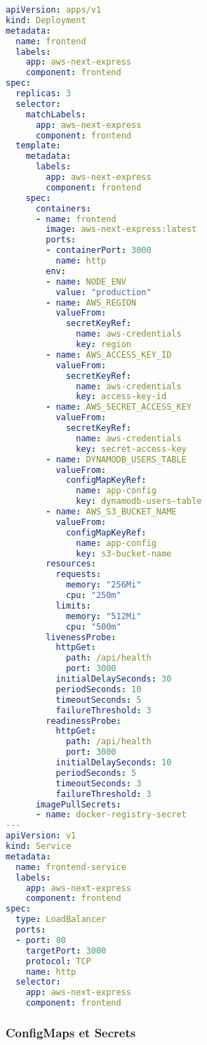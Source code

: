 \begin{lstlisting}[language=YAML, caption=k8s/frontend-deployment.yaml]
apiVersion: apps/v1
kind: Deployment
metadata:
  name: frontend
  labels:
    app: aws-next-express
    component: frontend
spec:
  replicas: 3
  selector:
    matchLabels:
      app: aws-next-express
      component: frontend
  template:
    metadata:
      labels:
        app: aws-next-express
        component: frontend
    spec:
      containers:
      - name: frontend
        image: aws-next-express:latest
        ports:
        - containerPort: 3000
          name: http
        env:
        - name: NODE_ENV
          value: "production"
        - name: AWS_REGION
          valueFrom:
            secretKeyRef:
              name: aws-credentials
              key: region
        - name: AWS_ACCESS_KEY_ID
          valueFrom:
            secretKeyRef:
              name: aws-credentials
              key: access-key-id
        - name: AWS_SECRET_ACCESS_KEY
          valueFrom:
            secretKeyRef:
              name: aws-credentials
              key: secret-access-key
        - name: DYNAMODB_USERS_TABLE
          valueFrom:
            configMapKeyRef:
              name: app-config
              key: dynamodb-users-table
        - name: AWS_S3_BUCKET_NAME
          valueFrom:
            configMapKeyRef:
              name: app-config
              key: s3-bucket-name
        resources:
          requests:
            memory: "256Mi"
            cpu: "250m"
          limits:
            memory: "512Mi"
            cpu: "500m"
        livenessProbe:
          httpGet:
            path: /api/health
            port: 3000
          initialDelaySeconds: 30
          periodSeconds: 10
          timeoutSeconds: 5
          failureThreshold: 3
        readinessProbe:
          httpGet:
            path: /api/health
            port: 3000
          initialDelaySeconds: 10
          periodSeconds: 5
          timeoutSeconds: 3
          failureThreshold: 3
      imagePullSecrets:
      - name: docker-registry-secret
---
apiVersion: v1
kind: Service
metadata:
  name: frontend-service
  labels:
    app: aws-next-express
    component: frontend
spec:
  type: LoadBalancer
  ports:
  - port: 80
    targetPort: 3000
    protocol: TCP
    name: http
  selector:
    app: aws-next-express
    component: frontend
\end{lstlisting}

\subsubsection{ConfigMaps et Secrets}

